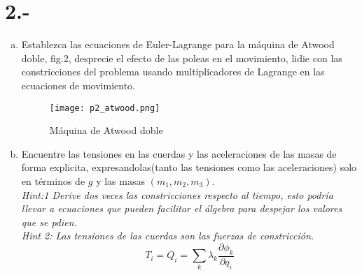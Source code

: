 \documentclass{article}
\begin{document}
\section*{2.-}
\begin{enumerate}[a)]
    \item Establezca las ecuaciones de Euler-Lagrange para la máquina de Atwood doble, 
    fig.2, desprecie el efecto de las poleas en el movimiento, lidie con las constricciones del problema usando multiplicadores 
    de Lagrange en las ecuaciones de movimiento.
    \begin{figure}[H]
        \centering
        \texttt{[image: p2\_atwood.png]}
        \caption{Máquina de Atwood doble}
    \end{figure}
    \item Encuentre las tensiones en las cuerdas y las aceleraciones de las masas de forma explicita, expresandolas(tanto las tensiones como las aceleraciones)
    solo en términos de $g$ y las masas $(m_1,m_2,m_3)$. \\
    \textit{Hint:1 Derive dos veces las constricciones respecto al tiempo, esto podría llevar a ecuaciones que pueden facilitar 
    el álgebra para despejar los valores que se pdien.} \\
    \textit{Hint 2: Las tensiones de las cuerdas son las fuerzas de constricción.} 
    \[ T_i = Q_i = \sum_k \lambda_k \frac{\partial \phi_k}{\partial q_i} \]
\end{enumerate}
\end{document}
